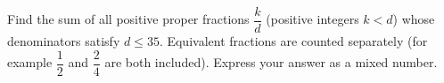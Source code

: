 Find the sum of all positive proper fractions $\dfrac {k}{d}$ (positive integers $k<d$) whose denominators satisfy $d\le35$. Equivalent fractions are counted separately (for example $\dfrac{1}{2}$ and $\dfrac{2}{4}$ are both included). Express your answer as a mixed number.
